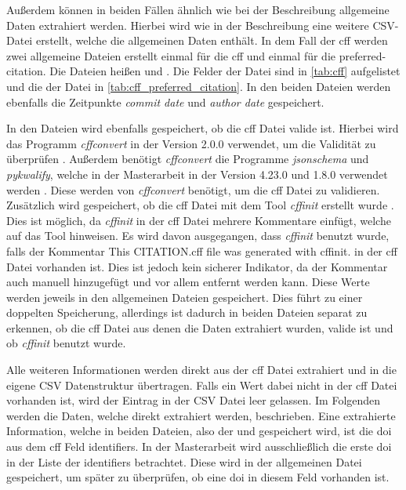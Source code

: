 Außerdem können in beiden Fällen ähnlich wie bei der Beschreibung allgemeine Daten extrahiert werden.
Hierbei wird wie in der Beschreibung eine weitere CSV-Datei erstellt, welche die allgemeinen Daten enthält.
In dem Fall der \gls{cff} werden zwei allgemeine Dateien erstellt einmal für die \gls{cff} und einmal für die \glqq preferred-citation\grqq{}.
Die Dateien heißen  und .
Die Felder der  Datei sind in \autoref{tab:cff} aufgelistet und die der  Datei in \autoref{tab:cff_preferred_citation}.
In den beiden Dateien werden ebenfalls die Zeitpunkte \emph{commit date} und \emph{author date} gespeichert.

In den Dateien wird ebenfalls gespeichert, ob die \gls{cff} Datei valide ist.
Hierbei wird das Programm \emph{cffconvert} in der Version 2.0.0 verwendet, um die Validität zu überprüfen \autocite{spaaks_cffconvert_2021}.
Außerdem benötigt \emph{cffconvert} die Programme \emph{jsonschema} und \emph{pykwalify}, welche in der Masterarbeit in der Version 4.23.0 und 1.8.0 verwendet werden \autocites{noauthor_python-jsonschemajsonschema_2024}{grokzen_grokzenpykwalify_2024}.
Diese werden von \emph{cffconvert} benötigt, um die \gls{cff} Datei zu validieren.
Zusätzlich wird gespeichert, ob die \gls{cff} Datei mit dem Tool \emph{cffinit} erstellt wurde \autocite{spaaks_cffinit_2023}.
Dies ist möglich, da \emph{cffinit} in der \gls{cff} Datei mehrere Kommentare einfügt, welche auf das Tool hinweisen.
Es wird davon ausgegangen, dass \emph{cffinit} benutzt wurde, falls der Kommentar \glqq This CITATION.cff file was generated with cffinit.\grqq{} in der \gls{cff} Datei vorhanden ist.
Dies ist jedoch kein sicherer Indikator, da der Kommentar auch manuell hinzugefügt und vor allem entfernt werden kann.
Diese Werte werden jeweils in den allgemeinen Dateien gespeichert.
Dies führt zu einer doppelten Speicherung, allerdings ist dadurch in beiden Dateien separat zu erkennen, ob die \gls{cff} Datei aus denen die Daten extrahiert wurden, valide ist und ob \emph{cffinit} benutzt wurde.

Alle weiteren Informationen werden direkt aus der \gls{cff} Datei extrahiert und in die eigene CSV Datenstruktur übertragen.
Falls ein Wert dabei nicht in der \gls{cff} Datei vorhanden ist, wird der Eintrag in der CSV Datei leer gelassen.
Im Folgenden werden die Daten, welche direkt extrahiert werden, beschrieben.
Eine extrahierte Information, welche in beiden Dateien, also der  und  gespeichert wird, ist die \gls{doi} aus dem \gls{cff} Feld \glqq identifiers\grqq{}.
In der Masterarbeit wird ausschließlich die erste \gls{doi} in der Liste der \glqq identifiers\grqq{} betrachtet.
Diese wird in der allgemeinen Datei gespeichert, um später zu überprüfen, ob eine \gls{doi} in diesem Feld vorhanden ist.

